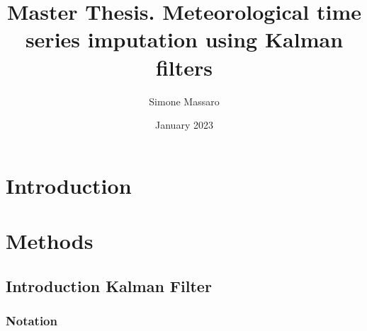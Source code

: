 \documentclass{article}
\title{Master Thesis. Meteorological time series imputation using Kalman filters}
\author{Simone Massaro}
\date{January 2023}
\begin{document}
\maketitle
\tableofcontents
\newpage

\section{Introduction}

\section{Methods}

\subsection{Introduction Kalman Filter}

\subsubsection{Notation}
\end{document}
